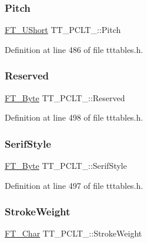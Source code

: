 \subsubsection{\texorpdfstring{Pitch}{Pitch}}
{\footnotesize\ttfamily \mbox{\hyperlink{fttypes_8h_a937f6c17cf5ffd09086d8610c37b9f58}{F\+T\+\_\+\+U\+Short}} T\+T\+\_\+\+P\+C\+L\+T\+\_\+\+::\+Pitch}



Definition at line 486 of file tttables.\+h.

\mbox{\label{struct_t_t___p_c_l_t___a2e46e3f5eaa51e02d831d3f6143f8846}} 
\subsubsection{\texorpdfstring{Reserved}{Reserved}}
{\footnotesize\ttfamily \mbox{\hyperlink{fttypes_8h_a51f26183ca0c9f4af958939648caeccd}{F\+T\+\_\+\+Byte}} T\+T\+\_\+\+P\+C\+L\+T\+\_\+\+::\+Reserved}



Definition at line 498 of file tttables.\+h.

\mbox{\label{struct_t_t___p_c_l_t___aa8e3d35937660a1e4959ee10a4800e6a}} 
\subsubsection{\texorpdfstring{SerifStyle}{SerifStyle}}
{\footnotesize\ttfamily \mbox{\hyperlink{fttypes_8h_a51f26183ca0c9f4af958939648caeccd}{F\+T\+\_\+\+Byte}} T\+T\+\_\+\+P\+C\+L\+T\+\_\+\+::\+Serif\+Style}



Definition at line 497 of file tttables.\+h.

\mbox{\label{struct_t_t___p_c_l_t___aaf28b05ac07bcdc1ae6f4ec9064434fc}} 
\subsubsection{\texorpdfstring{StrokeWeight}{StrokeWeight}}
{\footnotesize\ttfamily \mbox{\hyperlink{fttypes_8h_a0f851552b050883885f0a0855771f39d}{F\+T\+\_\+\+Char}} T\+T\+\_\+\+P\+C\+L\+T\+\_\+\+::\+Stroke\+Weight}



